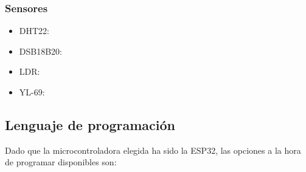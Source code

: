 \documentclass[runningheads]{llncs}
\begin{document}
\subsubsection*{Sensores}
\begin{itemize}
    \item DHT22:
    \item DSB18B20:
    \item LDR:
    \item YL-69:
\end{itemize}

\subsection*{Lenguaje de programación}

Dado que la microcontroladora elegida ha sido la ESP32, las opciones a la hora de programar disponibles son:
\end{document}
